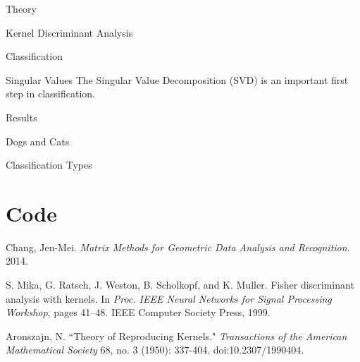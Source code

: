 \begin{section}{Theory}
\begin{subsection}{Kernel Discriminant Analysis}



\end{subsection}



\begin{homeworkSection}{Classification}

\end{homeworkSection}


\begin{homeworkSection}{Singular Values}
The Singular Value Decomposition (SVD) is an important first step in classification.
\end{homeworkSection}

\end{section}


\begin{section}{Results}
\begin{homeworkSection}{Dogs and Cats}
\end{homeworkSection}

\begin{homeworkSection}{Classification Types}

\end{homeworkSection}


\end{section}

\newpage

\appendix

\section{Code}\label{code}

%


\begin{thebibliography}{10}
    Chang, Jen-Mei. \textit{Matrix Methods for Geometric Data Analysis and Recognition}. 2014.

	S. Mika, G. Ratsch, J. Weston, B. Scholkopf, and K. Muller. Fisher discriminant analysis with kernels. In \textit{Proc. IEEE Neural Networks for Signal Processing Workshop}, pages 41–48. IEEE Computer Society Press, 1999.

	Aronszajn, N. ``Theory of Reproducing Kernels." \textit{Transactions of the American Mathematical Society} 68, no. 3 (1950): 337-404. doi:10.2307/1990404.
\end{thebibliography}


